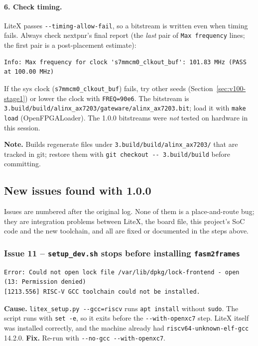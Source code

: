 \documentclass[11pt]{article}
\begin{document}
\paragraph{6. Check timing.} LiteX passes
\lstinline{--timing-allow-fail}, so a bitstream is written even when timing
fails. Always check nextpnr's final report (the \emph{last} pair of
\lstinline{Max frequency} lines; the first pair is a post-placement
estimate):
\begin{lstlisting}[style=termout]
Info: Max frequency for clock 's7mmcm0_clkout_buf': 101.83 MHz (PASS at 100.00 MHz)
\end{lstlisting}
If the sys clock (\lstinline{s7mmcm0_clkout_buf}) fails, try other seeds
(Section~\ref{sec:v100-stage1}) or lower the clock with
\lstinline{FREQ=90e6}. The bitstream is
\lstinline{3.build/build/alinx_ax7203/gateware/alinx_ax7203.bit}; load it
with \lstinline{make load} (OpenFPGALoader). The 1.0.0 bitstreams were
\emph{not} tested on hardware in this session.

\noindent\textbf{Note.} Builds regenerate files under
\lstinline{3.build/build/alinx_ax7203/} that are tracked in git; restore
them with \lstinline{git checkout -- 3.build/build} before committing.

\subsection{New issues found with 1.0.0}

Issues are numbered after the original log. None of them is a
place-and-route bug; they are integration problems between LiteX, the
board file, this project's SoC code and the new toolchain, and all are
fixed or documented in the steps above.

\subsubsection*{Issue 11 -- \texttt{setup\_dev.sh} stops before installing
\texttt{fasm2frames}}
\begin{lstlisting}[style=termout]
Error: Could not open lock file /var/lib/dpkg/lock-frontend - open (13: Permission denied)
[1213.556] RISC-V GCC toolchain could not be installed.
\end{lstlisting}
\textbf{Cause.} \lstinline{litex_setup.py --gcc=riscv} runs
\lstinline{apt install} without \lstinline{sudo}. The script runs with
\lstinline{set -e}, so it exits before the \lstinline{--with-openxc7} step.
LiteX itself was installed correctly, and the machine already had
\lstinline{riscv64-unknown-elf-gcc} 14.2.0.
\textbf{Fix.} Re-run with \lstinline{--no-gcc --with-openxc7}.
\end{document}
